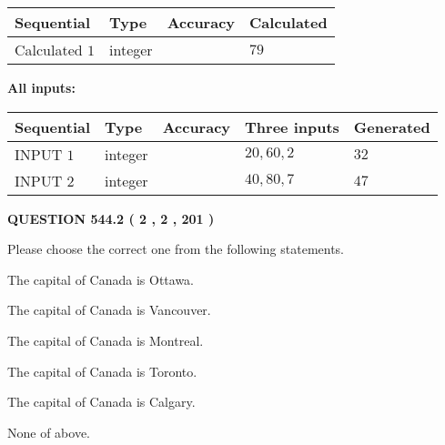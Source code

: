 \documentclass[12pt]{article}
\begin{document}
   
\noindent{}
   
   
  
  
\noindent\begin{tabular}{|l|l|l|l|}
\hline
 Sequential & Type & Accuracy & Calculated \\ 
\hline
 
 
  Calculated $  1 $ & integer &  & 
  $ 79 $ 
 \\  \hline  
 \end{tabular}
   
   
   
   
\noindent\vspace{0.1in}\hspace{-0.08in} {\textbf{\Large{All inputs: }}}
   
   
  
  
\noindent\begin{tabular}{|l|l|l|l|l|}
\hline
 Sequential & Type & Accuracy & Three inputs & Generated \\ 
\hline
 
 
  INPUT $  1 $ & integer &  & $
 20
 , 
 60
 , 
 2
 $ & $ 32 $ 
 \\  \hline  
 
 
  INPUT $  2 $ & integer &  & $
 40
 , 
 80
 , 
 7
 $ & $ 47 $ 
 \\  \hline  
 \end{tabular}
   
   
  
\vspace{0.2in}
  
{\textbf{\Large{QUESTION
544.2 
 ( 2 , 2 , 201 )
}}}
  
  
Please choose the correct one from the following statements.
 
 
The capital of Canada is Ottawa.
 
 
The capital of Canada is Vancouver.
 
 
The capital of Canada is Montreal.
 
 
The capital of Canada is Toronto.
 
 
The capital of Canada is Calgary.
 
 
 None of above.
 
 
\noindent{}
 
\end{document}
